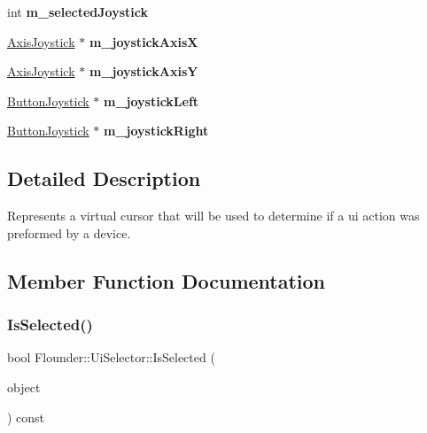 \begin{DoxyCompactItemize}
\mbox{\label{class_flounder_1_1_ui_selector_a6a34b197b5baf704b57601ca00324978}} 
int {\bfseries m\+\_\+selected\+Joystick}
\item 
\mbox{\label{class_flounder_1_1_ui_selector_a50d0d76e7b963dc485970c4dff869369}} 
\hyperlink{class_flounder_1_1_axis_joystick}{Axis\+Joystick} $\ast$ {\bfseries m\+\_\+joystick\+AxisX}
\item 
\mbox{\label{class_flounder_1_1_ui_selector_ae564d8361f4e2ef412ba3e44771823f2}} 
\hyperlink{class_flounder_1_1_axis_joystick}{Axis\+Joystick} $\ast$ {\bfseries m\+\_\+joystick\+AxisY}
\item 
\mbox{\label{class_flounder_1_1_ui_selector_aeeaad3faab382d2de6f05addffb9c730}} 
\hyperlink{class_flounder_1_1_button_joystick}{Button\+Joystick} $\ast$ {\bfseries m\+\_\+joystick\+Left}
\item 
\mbox{\label{class_flounder_1_1_ui_selector_a120d61c495216abccbe868d361dd7463}} 
\hyperlink{class_flounder_1_1_button_joystick}{Button\+Joystick} $\ast$ {\bfseries m\+\_\+joystick\+Right}
\end{DoxyCompactItemize}


\subsection{Detailed Description}
Represents a virtual cursor that will be used to determine if a ui action was preformed by a device. 



\subsection{Member Function Documentation}
\mbox{\label{class_flounder_1_1_ui_selector_a67bbc0090d8ac728e7697dab7044a356}} 
\subsubsection{\texorpdfstring{Is\+Selected()}{IsSelected()}}
{\footnotesize\ttfamily bool Flounder\+::\+Ui\+Selector\+::\+Is\+Selected (\begin{DoxyParamCaption}\item[{const Ui\+Object \&}]{object }\end{DoxyParamCaption}) const}



